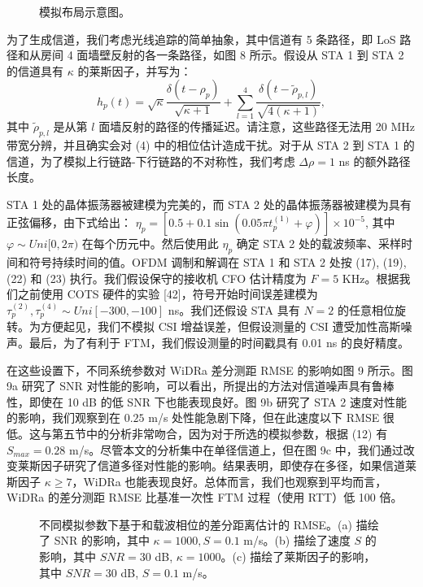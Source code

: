 \documentclass[journal]{IEEEtran}
\begin{document}
\begin{figure}[htbp]
\centering
{}
\caption{模拟布局示意图。}
\label{fig:fig8}
\end{figure}

为了生成信道，我们考虑光线追踪的简单抽象，其中信道有 5 条路径，即 LoS 路径和从房间 4 面墙壁反射的各一条路径，如图 8 所示。假设从 STA 1 到 STA 2 的信道具有 $\kappa$ 的莱斯因子，并写为：
\begin{equation}
h_p(t) = \sqrt{\kappa} \frac{\delta(t-\rho_p)}{\sqrt{\kappa+1}} + \sum_{l=1}^{4} \frac{\delta(t-\tilde{\rho}_{p,l})}{\sqrt{4(\kappa+1)}}, \label{eq:16}
\end{equation}
其中 $\tilde{\rho}_{p,l}$ 是从第 $l$ 面墙反射的路径的传播延迟。请注意，这些路径无法用 20 MHz 带宽分辨，并且确实会对 (4) 中的相位估计造成干扰。对于从 STA 2 到 STA 1 的信道，为了模拟上行链路-下行链路的不对称性，我们考虑 $\Delta\rho = 1$ ns 的额外路径长度。

STA 1 处的晶体振荡器被建模为完美的，而 STA 2 处的晶体振荡器被建模为具有正弦偏移，由下式给出：
$\eta_p = [0.5 + 0.1 \sin(0.05\pi t_p^{(1)} + \varphi)] \times 10^{-5}$,
其中 $\varphi \sim Uni[0, 2\pi)$ 在每个历元中。然后使用此 $\eta_p$ 确定 STA 2 处的载波频率、采样时间和符号持续时间的值。OFDM 调制和解调在 STA 1 和 STA 2 处按 (17), (19), (22) 和 (23) 执行。我们假设保守的接收机 CFO 估计精度为 $F=5$ KHz。根据我们之前使用 COTS 硬件的实验 [42]，符号开始时间误差建模为 $\tau_p^{(2)}, \tau_p^{(4)} \sim Uni[-300, -100]$ ns。我们还假设 STA 具有 $N=2$ 的任意相位旋转。为方便起见，我们不模拟 CSI 增益误差，但假设测量的 CSI 遭受加性高斯噪声。最后，为了有利于 FTM，我们假设测量的时间戳具有 0.01 ns 的良好精度。

在这些设置下，不同系统参数对 WiDRa 差分测距 RMSE 的影响如图 9 所示。图 9a 研究了 SNR 对性能的影响，可以看出，所提出的方法对信道噪声具有鲁棒性，即使在 10 dB 的低 SNR 下也能表现良好。图 9b 研究了 STA 2 速度对性能的影响，我们观察到在 $0.25$ m/s 处性能急剧下降，但在此速度以下 RMSE 很低。这与第五节中的分析非常吻合，因为对于所选的模拟参数，根据 (12) 有 $S_{max}=0.28$ m/s。尽管本文的分析集中在单径信道上，但在图 9c 中，我们通过改变莱斯因子研究了信道多径对性能的影响。结果表明，即使存在多径，如果信道莱斯因子 $\kappa \ge 7$，WiDRa 也能表现良好。总体而言，我们也观察到平均而言，WiDRa 的差分测距 RMSE 比基准一次性 FTM 过程（使用 RTT）低 100 倍。

\begin{figure}[htbp]
\centering
{}
\caption{不同模拟参数下基于和载波相位的差分距离估计的 RMSE。(a) 描绘了 SNR 的影响，其中 $\kappa=1000, S=0.1$ m/s。(b) 描绘了速度 $S$ 的影响，其中 $SNR=30$ dB, $\kappa=1000$。(c) 描绘了莱斯因子的影响，其中 $SNR=30$ dB, $S=0.1$ m/s。}
\label{fig:fig9}
\end{figure}
\end{document}
